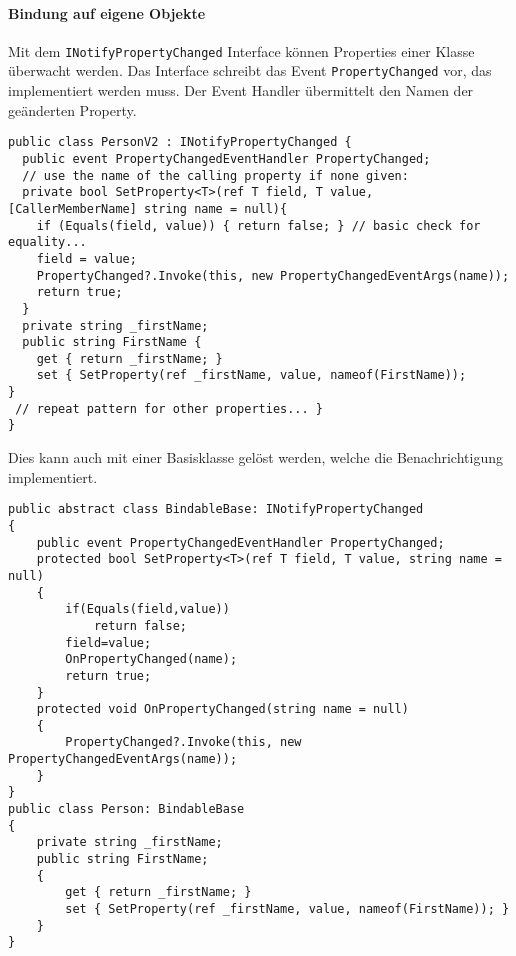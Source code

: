 \paragraph{Bindung auf eigene Objekte} 



Mit dem \verb+INotifyPropertyChanged+ Interface können Properties einer Klasse überwacht werden. Das Interface schreibt das Event \verb+PropertyChanged+ vor, das implementiert werden muss. Der Event Handler übermittelt den Namen der geänderten Property.
\begin{lstlisting}
public class PersonV2 : INotifyPropertyChanged {
  public event PropertyChangedEventHandler PropertyChanged;
  // use the name of the calling property if none given:
  private bool SetProperty<T>(ref T field, T value,  [CallerMemberName] string name = null){
    if (Equals(field, value)) { return false; } // basic check for equality...
    field = value;
    PropertyChanged?.Invoke(this, new PropertyChangedEventArgs(name)); 
    return true; 
  } 
  private string _firstName;
  public string FirstName { 
    get { return _firstName; }
    set { SetProperty(ref _firstName, value, nameof(FirstName));
}
 // repeat pattern for other properties... } 
}
\end{lstlisting}
Dies kann auch mit einer Basisklasse gelöst werden, welche die Benachrichtigung implementiert.
\begin{lstlisting}
public abstract class BindableBase: INotifyPropertyChanged
{
    public event PropertyChangedEventHandler PropertyChanged;
    protected bool SetProperty<T>(ref T field, T value, string name = null)
    {
        if(Equals(field,value))
            return false;
        field=value;
        OnPropertyChanged(name);
        return true;
    }
    protected void OnPropertyChanged(string name = null)
    {
        PropertyChanged?.Invoke(this, new PropertyChangedEventArgs(name));
    }
}
public class Person: BindableBase
{
    private string _firstName;
    public string FirstName;
    {
        get { return _firstName; }
        set { SetProperty(ref _firstName, value, nameof(FirstName)); }
    }
}
\end{lstlisting}
